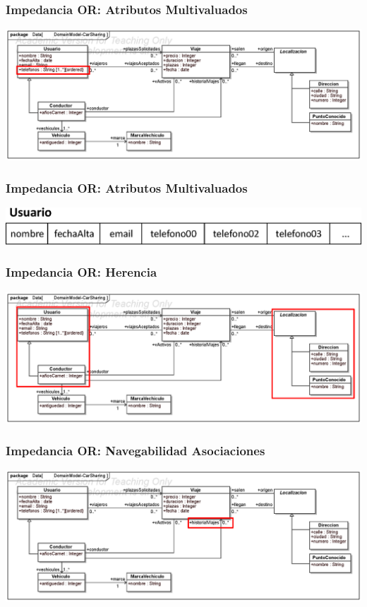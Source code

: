 \documentclass[a4paper,slidestop,xcolor=pst,blue]{beamer}
\begin{document}
\begin{frame}[c]
    \frametitle{Impedancia OR: Atributos Multivaluados}
    \begin{center}
        \includegraphics[width=\linewidth]{images/ooMismatch/ooMismatch02.eps}
    \end{center}
\end{frame}

\begin{frame}[c]
    \frametitle{Impedancia OR: Atributos Multivaluados}
    \begin{center}
        \includegraphics[width=0.8\linewidth]{images/ooMismatch/ooMismatch03.eps}
    \end{center}
\end{frame}

\begin{frame}[c]
    \frametitle{Impedancia OR: Herencia}
    \begin{center}
        \includegraphics[width=\linewidth]{images/ooMismatch/ooMismatch04.eps}
    \end{center}
\end{frame}

\begin{frame}[c]
    \frametitle{Impedancia OR: Navegabilidad Asociaciones}
    \begin{center}
        \includegraphics[width=\linewidth]{images/ooMismatch/ooMismatch05.eps}
    \end{center}
\end{frame}
\end{document}
